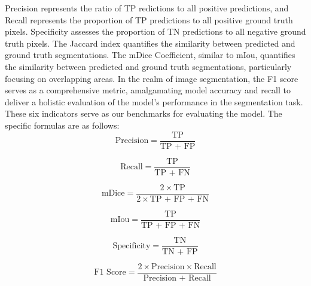 \documentclass[review]{elsarticle}
\begin{document}
	Precision represents the ratio of TP redictions to all positive predictions, and Recall represents the proportion of TP predictions to all positive ground truth pixels. Specificity assesses the proportion of TN predictions to all negative ground truth pixels. The Jaccard index quantifies the similarity between predicted and ground truth segmentations. The mDice Coefficient, similar to mIou, quantifies the similarity between predicted and ground truth segmentations, particularly focusing on overlapping areas. In the realm of image segmentation, the F1 score serves as a comprehensive metric, amalgamating model accuracy and recall to deliver a holistic evaluation of the model's performance in the segmentation task. These six indicators serve as our benchmarks for evaluating the model. The specific formulas are as follows:
	\begin{equation}
		\text{Precision} = \frac{\text{TP}}{\text{TP + FP}}
		\label{eq_5}
	\end{equation}

	\begin{equation}
		\text{Recall} = \frac{\text{TP}}{\text{TP + FN}}
	\end{equation}

	\begin{equation}
		\text{mDice} = \frac{2 \times \text{TP}}{2 \times \text{TP + FP + FN}}
	\end{equation}

	\begin{equation}
		\text{mIou} = \frac{\text{TP}}{\text{TP + FP + FN}}
	\end{equation}

	\begin{equation}
		\text{Specificity} = \frac{\text{TN}}{\text{TN + FP}}
	\end{equation}

	\begin{equation}
		\text{F1 Score} = \frac{2 \times \text{Precision} \times \text{Recall}}{\text{Precision + Recall}}
		\label{eq_10}
	\end{equation}
\end{document}
